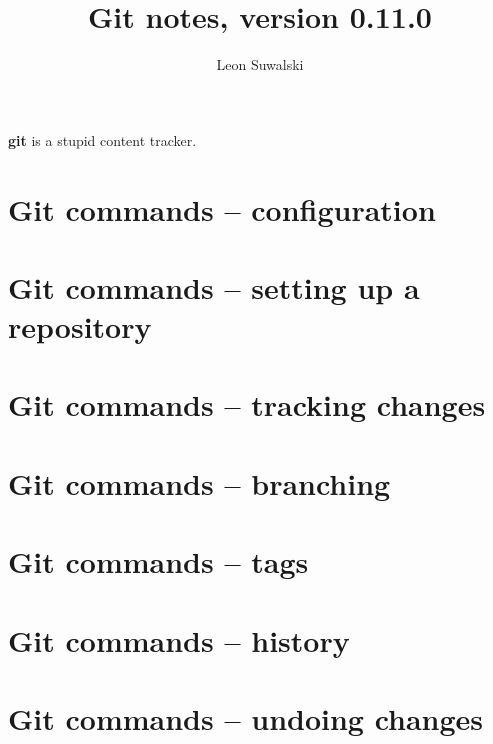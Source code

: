 \documentclass{charuun}
\title{Git notes, version 0.11.0}
\author{Leon Suwalski}
\begin{document}
\maketitle
\raggedright

\textbf{git} is a stupid content tracker.

\section{Git commands -- configuration}


\section{Git commands -- setting up a repository}



\section{Git commands -- tracking changes}






\section{Git commands -- branching}






\section{Git commands -- tags}


\section{Git commands -- history}







\section{Git commands -- undoing changes}




\end{document}
